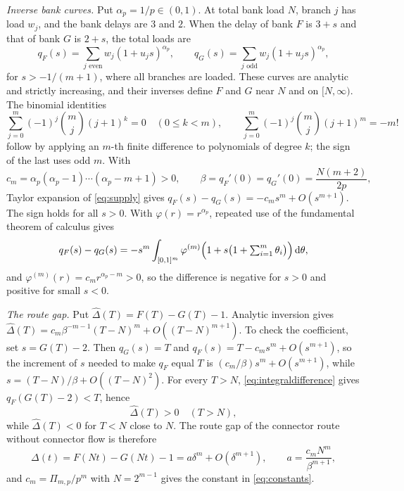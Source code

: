 \emph{Inverse bank curves.} Put $\alpha_p=1/p\in(0,1)$. At total bank load $N$, branch $j$ has load $w_j$, and the bank delays are $3$ and $2$. When the delay of bank $F$ is $3+s$ and that of bank $G$ is $2+s$, the total loads are
\begin{equation}\label{eq:supply}
 q_F(s)=\sum_{j\text{ even}}w_j(1+u_js)^{\alpha_p},\qquad q_G(s)=\sum_{j\text{ odd}}w_j(1+u_js)^{\alpha_p},
\end{equation}
for $s>-1/(m+1)$, where all branches are loaded. These curves are analytic and strictly increasing, and their inverses define $F$ and $G$ near $N$ and on $[N,\infty)$. The binomial identities
\begin{equation}\label{eq:moments}
 \sum_{j=0}^m(-1)^j\binom mj(j+1)^k=0\quad(0\le k<m),\qquad \sum_{j=0}^m(-1)^j\binom mj(j+1)^m=-m!
\end{equation}
follow by applying an $m$-th finite difference to polynomials of degree $k$; the sign of the last uses odd $m$. With
\begin{equation}\label{eq:cA}
 c_m=\alpha_p(\alpha_p-1)\cdots(\alpha_p-m+1)>0,\qquad \beta=q_F'(0)=q_G'(0)=\frac{N(m+2)}{2p},
\end{equation}
Taylor expansion of \eqref{eq:supply} gives $q_F(s)-q_G(s)=-c_ms^m+O(s^{m+1})$. The sign holds for all $s>0$. With $\varphi(r)=r^{\alpha_p}$, repeated use of the fundamental theorem of calculus gives
\begin{equation}\label{eq:integraldifference}
 q_F(s)-q_G(s)=-s^m\int_{[0,1]^m}\varphi^{(m)}\Bigl(1+s\bigl(1+\textstyle\sum_{i=1}^m\theta_i\bigr)\Bigr)\,\mathrm d\theta,
\end{equation}
and $\varphi^{(m)}(r)=c_mr^{\alpha_p-m}>0$, so the difference is negative for $s>0$ and positive for small $s<0$.

\emph{The route gap.} Put $\widehat\Delta(T)=F(T)-G(T)-1$. Analytic inversion gives $\widehat\Delta(T)=c_m\beta^{-m-1}(T-N)^m+O((T-N)^{m+1})$. To check the coefficient, set $s=G(T)-2$. Then $q_G(s)=T$ and $q_F(s)=T-c_ms^m+O(s^{m+1})$, so the increment of $s$ needed to make $q_F$ equal $T$ is $(c_m/\beta)s^m+O(s^{m+1})$, while $s=(T-N)/\beta+O((T-N)^2)$. For every $T>N$, \eqref{eq:integraldifference} gives $q_F(G(T)-2)<T$, hence
\begin{equation}\label{eq:globalH}
 \widehat\Delta(T)>0\quad(T>N),
\end{equation}
while $\widehat\Delta(T)<0$ for $T<N$ close to $N$. The route gap of the connector route without connector flow is therefore
\begin{equation}\label{eq:D}
 \Delta(t)=F(Nt)-G(Nt)-1=a\delta^m+O(\delta^{m+1}),\qquad a=\frac{c_mN^m}{\beta^{m+1}},
\end{equation}
and $c_m=\Pi_{m,p}/p^m$ with $N=2^{m-1}$ gives the constant in \eqref{eq:constants}.

